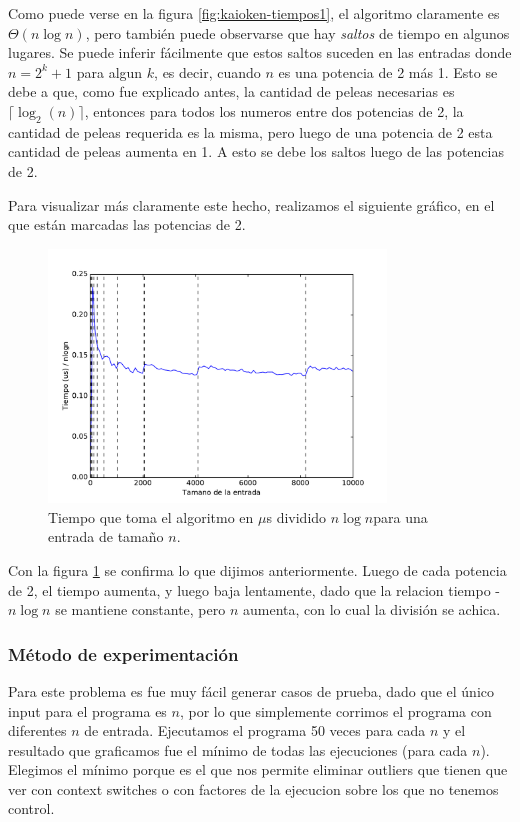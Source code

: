 Como puede verse en la figura \ref{fig:kaioken-tiempos1}, el algoritmo claramente es $\Theta(n \log n)$, pero también puede observarse que hay \emph{saltos} de tiempo en algunos lugares. Se puede inferir fácilmente que estos saltos suceden en las entradas donde $n = 2^k + 1$ para algun $k$, es decir, cuando $n$ es una potencia de 2 más 1. Esto se debe a que, como fue explicado antes, la cantidad de peleas necesarias es $\lceil \log_2(n) \rceil$, entonces para todos los numeros entre dos potencias de 2, la cantidad de peleas requerida es la misma, pero luego de una potencia de 2 esta cantidad de peleas aumenta en 1. A esto se debe los saltos luego de las potencias de 2.

Para visualizar más claramente este hecho, realizamos el siguiente gráfico, en el que están marcadas las potencias de 2.

\begin{figure}[H]
 \centering
	\includegraphics[width=0.8\textwidth]{img/tiempos/kaioken2.pdf}
	\caption{\footnotesize Tiempo que toma el algoritmo en $\mu$s dividido $n\log n$para una entrada de tamaño $n$.}
	\label{fig:kaioken-tiempos2}
\end{figure}

Con la figura \ref{fig:kaioken-tiempos2} se confirma lo que dijimos anteriormente. Luego de cada potencia de 2, el tiempo aumenta, y luego baja lentamente, dado que la relacion tiempo - $n \log n$ se mantiene constante, pero $n$ aumenta, con lo cual la división se achica.


\subsubsection{M\'etodo de experimentación}

Para este problema es fue muy fácil generar casos de prueba, dado que el único input para el programa es $n$, por lo que simplemente corrimos el programa con diferentes $n$ de entrada. Ejecutamos el programa 50 veces para cada $n$ y el resultado que graficamos fue el mínimo de todas las ejecuciones (para cada $n$). Elegimos el mínimo porque es el que nos permite eliminar outliers que tienen que ver con context switches o con factores de la ejecucion sobre los que no tenemos control.


